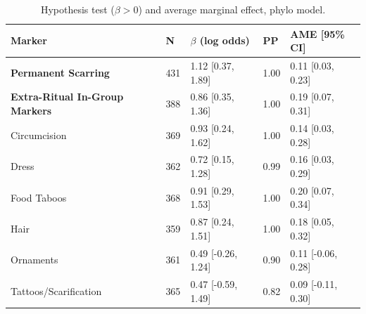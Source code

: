 \begin{table}[!ht]
\centering
\small
\caption{Hypothesis test ($\beta > 0$) and average marginal effect, phylo model.}
\label{tab:ext_hypothesis_ame_phylo}
\begin{tabular}{lllll}
\toprule
Marker & N & $\beta$ (log odds) & PP & AME [95\% CI] \\
\midrule
\textbf{Permanent Scarring} & 431 & 1.12 [0.37, 1.89] & 1.00 & 0.11 [0.03, 0.23] \\
\textbf{Extra-Ritual In-Group Markers} & 388 & 0.86 [0.35, 1.36] & 1.00 & 0.19 [0.07, 0.31] \\
\midrule
Circumcision & 369 & 0.93 [0.24, 1.62] & 1.00 & 0.14 [0.03, 0.28] \\
Dress & 362 & 0.72 [0.15, 1.28] & 0.99 & 0.16 [0.03, 0.29] \\
Food Taboos & 368 & 0.91 [0.29, 1.53] & 1.00 & 0.20 [0.07, 0.34] \\
Hair & 359 & 0.87 [0.24, 1.51] & 1.00 & 0.18 [0.05, 0.32] \\
Ornaments & 361 & 0.49 [-0.26, 1.24] & 0.90 & 0.11 [-0.06, 0.28] \\
Tattoos/Scarification & 365 & 0.47 [-0.59, 1.49] & 0.82 & 0.09 [-0.11, 0.30] \\
\bottomrule
\end{tabular}
\end{table}